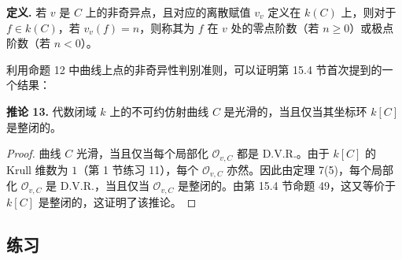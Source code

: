 \noindent\textbf{定义.} 若 $v$ 是 $C$ 上的非奇异点，且对应的离散赋值 $v_v$ 定义在 $k(C)$ 上，则对于 $f\in k(C)$，若 $v_v(f)=n$，则称其为 $f$ 在 $v$ 处的零点阶数（若 $n\geq0$）或极点阶数（若 $n<0$）。

利用命题 12 中曲线上点的非奇异性判别准则，可以证明第 15.4 节首次提到的一个结果：

\medskip
\noindent\textbf{推论 13.} 代数闭域 $k$ 上的不可约仿射曲线 $C$ 是光滑的，当且仅当其坐标环 $k[C]$ 是整闭的。

\begin{proof}
曲线 $C$ 光滑，当且仅当每个局部化 $\mathcal O_{v,C}$ 都是 D.V.R.。由于 $k[C]$ 的 Krull 维数为 $1$（第 1 节练习 11），每个 $\mathcal O_{v,C}$ 亦然。因此由定理 7(5)，每个局部化 $\mathcal O_{v,C}$ 是 D.V.R.，当且仅当 $\mathcal O_{v,C}$ 是整闭的。由第 15.4 节命题 49，这又等价于 $k[C]$ 是整闭的，这证明了该推论。
\end{proof}

\subsection*{练习}

